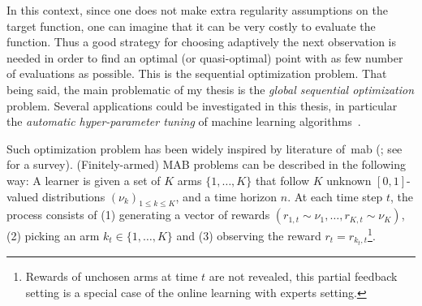 
In this context, since one does not make extra regularity assumptions on the target function, one can imagine that it can be very costly to evaluate the function. Thus a good strategy for choosing adaptively the next observation is needed in order to find an optimal (or quasi-optimal) point with as few number of evaluations as possible. This is the sequential optimization problem. That being said, the main problematic of my thesis is the \emph{global sequential optimization} problem. Several applications could be investigated in this thesis, in particular the \emph{automatic hyper-parameter tuning} of machine learning algorithms~\citep{samothrakis2013,hoffman2014bayesgap,jamieson2016hyperband,li2017hyperband}.

Such optimization problem has been widely inspired by literature of~\gls{mab} (\citealt{lai1985,auer2002ucb}; see~\citealt{munos2014} for a survey). (Finitely-armed) MAB problems can be described in the following way: A learner is given a set of $K$ arms $\{1,\ldots,K\}$ that follow $K$ unknown $[0,1]$-valued distributions $(\nu_k)_{1 \leq k \leq K}$, and a time horizon $n$. At each time step $t$, the process consists of (1) generating a vector of rewards $(r_{1,t} \sim \nu_1, \ldots, r_{K,t} \sim \nu_K)$, (2) picking an arm $k_t \in \{1,\ldots,K\}$ and (3) observing the reward $r_t = r_{k_t, t}$\footnote{Rewards of unchosen arms at time $t$ are not revealed, this partial feedback setting is a special case of the online learning with experts setting.}.

